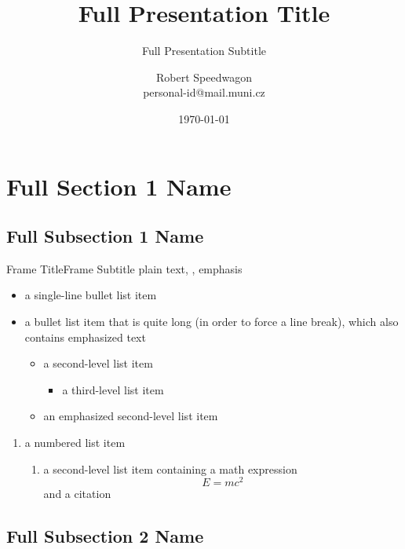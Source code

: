 \documentclass[
  aspectratio=169,
]{beamer}
\title[Short Presentation Title]{Full Presentation Title}
\subtitle[Short Presentation Subtitle]{Full Presentation Subtitle}
\author[R. Speedwagon]{Robert Speedwagon\texorpdfstring{\\}{, }personal-id@mail.muni.cz}
\institute[University Center Telč MU]{University Center Telč, Masaryk University}
\date{\today}
\begin{document}
\begin{frame}[plain]
\maketitle
\end{frame}

\section[Short Section 1 Name]{Full Section 1 Name}
\subsection[Short Subsection 1 Name]{Full Subsection 1 Name}

\begin{frame}{Frame Title}{Frame Subtitle}
plain text, , \alert{emphasis}
\begin{itemize}
  \item a single-line bullet list item
  \item a bullet list item that is quite long (in order to force a line break),
    which also contains \alert{emphasized text}
  \begin{itemize}
    \item a second-level list item
    \begin{itemize}
      \item a third-level list item
    \end{itemize}
    \item \alert{an emphasized second-level list item}
  \end{itemize}
\end{itemize}
\begin{enumerate}
  \item a numbered list item
  \begin{enumerate}
    \item a second-level list item containing a math expression
      \[ E = mc^2 \]
      and a citation \cite{einstein1905tragheit}
  \end{enumerate}
\end{enumerate}
\end{frame}

\subsection[Short Subsection 2 Name]{Full Subsection 2 Name}
\end{document}
